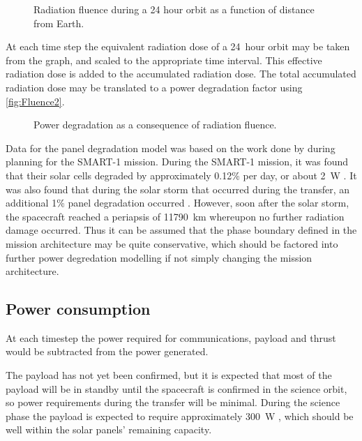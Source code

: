\begin{figure}
\caption{Radiation fluence during a 24 hour orbit as a function of distance from Earth.}
\label{fig:Fluence}
\centering
\def\svgwidth{\figurewidth}

\end{figure}
  
At each time step the equivalent radiation dose of a 24~hour orbit may be taken from the graph, and scaled to the appropriate time interval. This effective radiation dose is added to the accumulated radiation dose. The total accumulated radiation dose may be translated to a power degradation factor using \autoref{fig:Fluence2}.

\begin{figure}
\caption{Power degradation as a consequence of radiation fluence.}
\label{fig:Fluence2}
\centering
\def\svgwidth{\figurewidth}

\end{figure}

Data for the panel degradation model was based on the work done by \textcite{Hechler2002} during planning for the SMART-1 mission. During the SMART-1 mission, it was found that their solar cells degraded by approximately 0.12\% per day, or about 2~W \parencite{Racca5}. It was also found that during the solar storm that occurred during the transfer, an additional 1\% panel degradation occurred \parencite{Racca8}. However, soon after the solar storm, the spacecraft reached a periapsis of 11790~km whereupon no further radiation damage occurred. Thus it can be assumed that the phase boundary defined in the mission architecture may be quite conservative, which should be factored into further power degredation modelling if not simply changing the mission architecture.


\subsection{Power consumption} \label{sub:Power-consumption}

At each timestep the power required for communications, payload and thrust would be subtracted from the power generated. 

The payload has not yet been confirmed, but it is expected that most of the payload will be in standby until the spacecraft is confirmed in the science orbit, so power requirements during the transfer will be minimal. During the science phase the payload is expected to require approximately 300~W \parencite{web_BW-1}, which should be well within the solar panels' remaining capacity.

